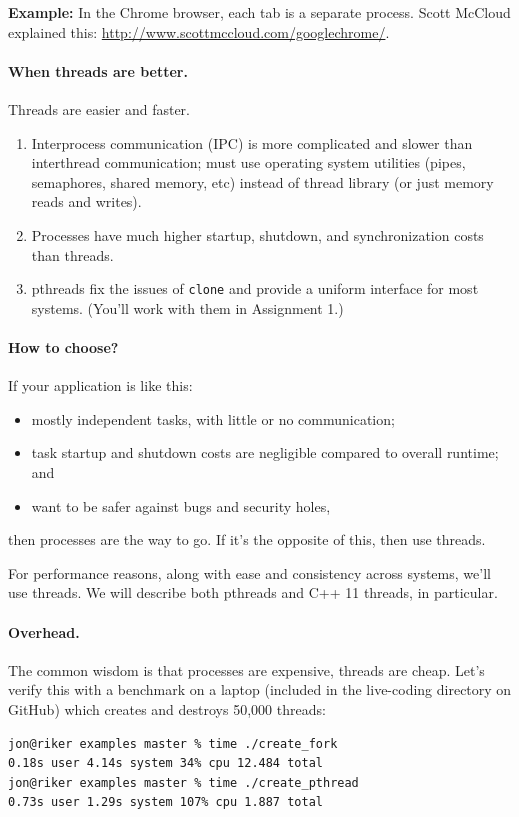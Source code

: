 \documentclass[a4paper]{report}
\begin{document}
{\bf Example:} In the Chrome browser, each tab is a separate
process. Scott McCloud explained this:
\url{http://www.scottmccloud.com/googlechrome/}.

\paragraph{When threads are better.} Threads are easier and faster.

  \begin{enumerate}
    \item Interprocess communication (IPC) is more complicated and slower than interthread
          communication; must use operating system utilities (pipes, semaphores, shared
              memory, etc) instead of thread library (or just memory reads and writes).
    \item Processes have much higher startup, shutdown, and synchronization costs than threads.
    \item pthreads fix the issues of {\tt clone} and provide a
          uniform interface for most systems. (You'll work with them in Assignment 1.)
  \end{enumerate}

\paragraph{How to choose?}
  If your application is like this:
  \begin{itemize}
    \item mostly independent tasks, with little or no communication;
    \item task startup and shutdown costs are negligible compared to overall runtime; and
    \item want to be safer against bugs and security holes,
  \end{itemize}
then processes are the way to go. If it's the opposite of this, then use threads.

For performance reasons, along with ease and consistency across systems, we'll use threads. We will describe both pthreads and C++ 11 threads, in particular.

\paragraph{Overhead.} The common wisdom is that processes are
expensive, threads are cheap. Let's verify this with a benchmark on a
laptop (included in the live-coding directory on GitHub) which creates and destroys 50,000 threads:
  \begin{lstlisting}[basicstyle=\scriptsize]
jon@riker examples master % time ./create_fork 
0.18s user 4.14s system 34% cpu 12.484 total
jon@riker examples master % time ./create_pthread 
0.73s user 1.29s system 107% cpu 1.887 total
  \end{lstlisting}
\end{document}
